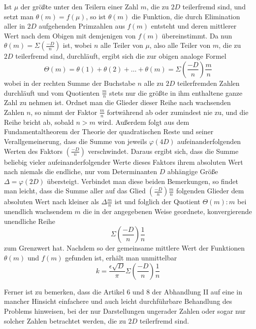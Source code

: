 Ist $\mu$ der größte unter den Teilern einer Zahl $m$, die zu $2D$ teilerfremd sind, und setzt man $\theta(m)=f(\mu)$, so ist $\theta(m)$ die Funktion, die durch Elimination aller in $2D$ aufgehenden Primzahlen aus $f(m)$ entsteht und deren mittlerer Wert nach dem Obigen mit demjenigen von $f(m)$ übereinstimmt. Da nun $\theta(m)=\Sigma\left(\frac{-D}n\right)$ ist, wobei $n$ alle Teiler von $\mu$, also alle Teiler von $m$, die zu $2D$ teilerfremd sind, durchläuft, ergibt sich die zur obigen analoge Formel
\[
\Theta(m)=\theta(1)+\theta(2)+\ldots+\theta(m)=\Sigma\left(\frac{-D}n\right)\frac mn
\]
wobei in der rechten Summe der Buchstabe $n$ alle zu $2D$ teilerfremden Zahlen durchläuft und vom Quotienten $\frac mn$ stets nur die größte in ihm enthaltene ganze Zahl zu nehmen ist. Ordnet man die Glieder dieser Reihe nach wachsenden Zahlen $n$, so nimmt der Faktor $\frac mn$ fortwährend ab oder zumindest nie zu, und die Reihe bricht ab, sobald $n>m$ wird. Außerdem folgt aus dem Fundamentaltheorem der Theorie der quadratischen Reste und seiner Verallgemeinerung, dass die Summe von jeweils $\varphi(4D)$ aufeinanderfolgenden Werten des Faktors $\left(\frac{-D}n\right)$ verschwindet. Daraus ergibt sich, dass die Summe beliebig vieler aufeinanderfolgender Werte
dieses Faktors ihrem absoluten Wert nach niemals die endliche, nur vom Determinanten $D$ abhängige Größe $\Delta=\varphi(2D)$ übersteigt. Verbindet man diese beiden Bemerkungen, so findet man leicht, dass die Summe aller auf das Glied $\left(\frac{-D}n\right)\frac mn$ folgenden Glieder dem absoluten Wert nach kleiner als $\Delta\frac mn$ ist und folglich der Quotient $\Theta(m):m$ bei unendlich wachsendem $m$ die in der angegebenen Weise geordnete, konvergierende unendliche Reihe
\[
\Sigma\left(\frac{-D}n\right)\frac1n
\]
zum Grenzwert hat. Nachdem so der gemeinsame mittlere Wert der Funktionen $\theta(m)$ und $f(m)$ gefunden ist, erhält man unmittelbar
\[
k=\frac{\epsilon\surd D}\pi\Sigma\left(\frac{-D}n\right)\frac1n
\]

Ferner ist zu bemerken, dass die Artikel 6 und 8 der Abhandlung II auf eine in mancher Hinsicht einfachere und auch leicht durchführbare Behandlung des Problems hinweisen, bei der nur Darstellungen ungerader Zahlen oder sogar nur solcher Zahlen betrachtet werden, die zu $2D$ teilerfremd sind.
\BookRule{35mm}
